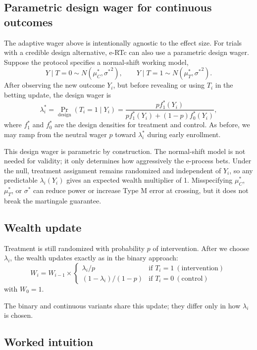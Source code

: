 \documentclass[10pt]{article}
\begin{document}
\subsection{Parametric design wager for continuous outcomes}

The adaptive wager above is intentionally agnostic to the effect size. For trials with a credible design alternative, e-RTc can also use a parametric design wager. Suppose the protocol specifies a normal-shift working model,
\[
Y \mid T=0 \sim N(\mu_C^\ast, {\sigma^\ast}^2),
\qquad
Y \mid T=1 \sim N(\mu_T^\ast, {\sigma^\ast}^2).
\]
After observing the new outcome $Y_i$, but before revealing or using $T_i$ in the betting update, the design wager is
\[
\lambda_i^\ast
= \Pr_{\text{design}}(T_i=1 \mid Y_i)
=
\frac{p f_1^\ast(Y_i)}
{p f_1^\ast(Y_i) + (1-p) f_0^\ast(Y_i)},
\]
where $f_1^\ast$ and $f_0^\ast$ are the design densities for treatment and control. As before, we may ramp from the neutral wager $p$ toward $\lambda_i^\ast$ during early enrollment.

This design wager is parametric by construction. The normal-shift model is not needed for validity; it only determines how aggressively the e-process bets. Under the null, treatment assignment remains randomized and independent of $Y_i$, so any predictable $\lambda_i(Y_i)$ gives an expected wealth multiplier of 1. Misspecifying $\mu_C^\ast$, $\mu_T^\ast$, or $\sigma^\ast$ can reduce power or increase Type M error at crossing, but it does not break the martingale guarantee.

\subsection{Wealth update}

Treatment is still randomized with probability $p$ of intervention. After we choose $\lambda_i$, the wealth updates exactly as in the binary approach:
\begin{equation}
W_i = W_{i-1} \times 
\begin{cases}
\lambda_i / p & \text{if } T_i = 1 \ (\text{intervention}) \\
(1 - \lambda_i) / (1-p) & \text{if } T_i = 0 \ (\text{control})
\end{cases}
\end{equation}
with $W_0 = 1$.

The binary and continuous variants share this update; they differ only in how $\lambda_i$ is chosen.

\subsection{Worked intuition}
\end{document}
